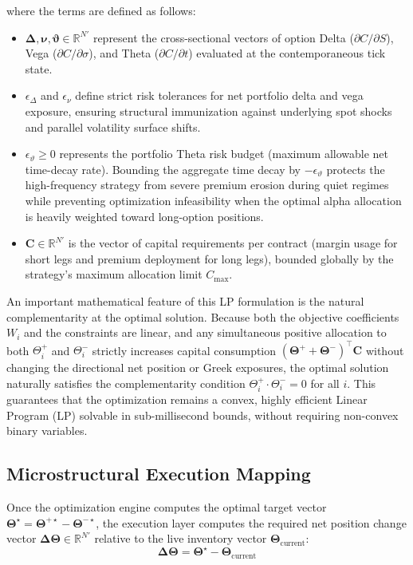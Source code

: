 \documentclass[11pt, a4paper]{article}
\begin{document}
where the terms are defined as follows:
\begin{itemize}
    \item $\boldsymbol{\Delta}, \boldsymbol{\nu}, \boldsymbol{\vartheta} \in \mathbb{R}^{N'}$ represent the cross-sectional vectors of option Delta ($\partial C / \partial S$), Vega ($\partial C / \partial \sigma$), and Theta ($\partial C / \partial t$) evaluated at the contemporaneous tick state.
    \item $\epsilon_{\Delta}$ and $\epsilon_{\nu}$ define strict risk tolerances for net portfolio delta and vega exposure, ensuring structural immunization against underlying spot shocks and parallel volatility surface shifts.
    \item $\epsilon_{\vartheta} \ge 0$ represents the portfolio Theta risk budget (maximum allowable net time-decay rate). Bounding the aggregate time decay by $-\epsilon_{\vartheta}$ protects the high-frequency strategy from severe premium erosion during quiet regimes while preventing optimization infeasibility when the optimal alpha allocation is heavily weighted toward long-option positions.
    \item $\mathbf{C} \in \mathbb{R}^{N'}$ is the vector of capital requirements per contract (margin usage for short legs and premium deployment for long legs), bounded globally by the strategy's maximum allocation limit $C_{\max}$.
\end{itemize}

An important mathematical feature of this LP formulation is the natural complementarity at the optimal solution. Because both the objective coefficients $W_i$ and the constraints are linear, and any simultaneous positive allocation to both $\Theta^+_i$ and $\Theta^-_i$ strictly increases capital consumption $(\boldsymbol{\Theta}^+ + \boldsymbol{\Theta}^-)^\top \mathbf{C}$ without changing the directional net position or Greek exposures, the optimal solution naturally satisfies the complementarity condition $\Theta^+_i \cdot \Theta^-_i = 0$ for all $i$. This guarantees that the optimization remains a convex, highly efficient Linear Program (LP) solvable in sub-millisecond bounds, without requiring non-convex binary variables.

\subsection{Microstructural Execution Mapping}
\label{subsec:execution-mapping}
Once the optimization engine computes the optimal target vector $\boldsymbol{\Theta}^\star = \boldsymbol{\Theta}^{+\star} - \boldsymbol{\Theta}^{-\star}$, the execution layer computes the required net position change vector $\boldsymbol{\Delta\Theta} \in \mathbb{R}^{N'}$ relative to the live inventory vector $\boldsymbol{\Theta}_{\text{current}}$:
\begin{equation}
\boldsymbol{\Delta\Theta} = \boldsymbol{\Theta}^\star - \boldsymbol{\Theta}_{\text{current}}
\end{equation}
\end{document}

